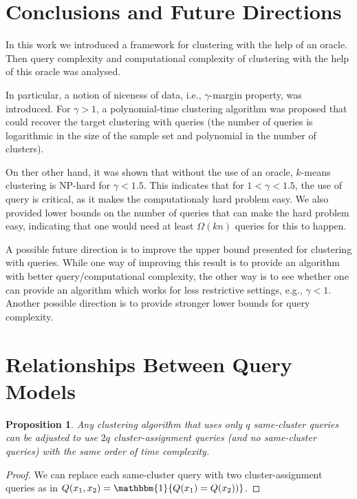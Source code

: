 \documentclass{article}
\newtheorem{proposition}[theorem]{Proposition}
\begin{document}
\section{Conclusions and Future Directions}
In this work we introduced a framework for clustering with the help of an oracle. Then query complexity and computational complexity of clustering with the help of this oracle was analysed. 

In particular, a notion of niceness of data, i.e., $\gamma$-margin property, was introduced. For $\gamma>1$, a polynomial-time clustering algorithm was proposed that could recover the target clustering with queries (the number of queries is logarithmic in the size of the sample set and polynomial in the number of clusters). 

On ther other hand, it was shown that without the use of an oracle, $k$-means clustering is NP-hard for $\gamma < 1.5$. This indicates that for $1<\gamma<1.5$, the use of query is critical, as it makes the computationaly hard problem easy. We also provided lower bounds on the number of queries that can make the hard problem easy, indicating that one would need at least $\Omega(kn)$ queries for this to happen.

A possible future direction is to improve the upper bound presented for clustering with queries. While one way of improving this result is to provide an algorithm with better query/computational complexity, the other way is to see whether one can provide an algorithm which works for less restrictive settings, e.g., $\gamma < 1$. Another possible direction is to provide stronger lower bounds for query complexity.




\appendix
\section{Relationships Between Query Models}
\label{appendix:diffQueryModels}

\begin{proposition}
Any clustering algorithm that uses only $q$ same-cluster queries can be adjusted to use $2q$ cluster-assignment queries (and no same-cluster queries) with the same order of time complexity.
\end{proposition}
\begin{proof}
We can replace each same-cluster query with two cluster-assignment queries as in $Q(x_1,x_2)={\mathbbm{1}}\{Q(x_1)=Q(x_2))\}$.
\end{proof}
\end{document}
